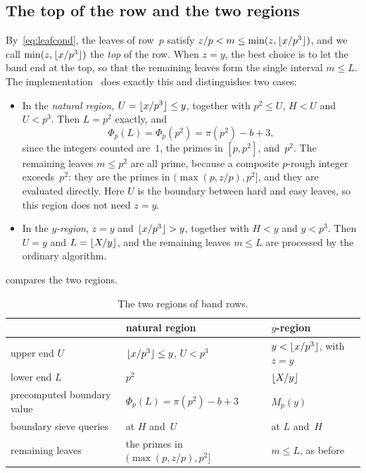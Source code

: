 \documentclass[11pt,a4paper]{amsart}
\numberwithin{equation}{section}
\DeclarePairedDelimiter{\floor}{\lfloor}{\rfloor}
\begin{document}
\subsection{The top of the row and the two regions}\label{sec:regions}
By~\eqref{eq:leafcond}, the leaves of row~$p$ satisfy
$z/p<m\le\min(z,\floor{x/p^3})$, and we call $\min(z,\floor{x/p^3})$ the
\emph{top} of the row. When $z=y$, the best choice is to let the band end at the
top, so that the remaining leaves form the single interval $m\le L$. The
implementation~\cite{PR146} does exactly this and distinguishes two
cases:
\begin{itemize}
\item In the \emph{natural region}, $U=\floor{x/p^3}\le y$, together with
$p^2\le U$, $H<U$ and $U<p^3$. Then $L=p^2$ exactly, and
\[
  \Phi_p(L)=\Phi_p(p^2)=\pi(p^2)-b+3,
\]
since the integers counted are~$1$, the primes in $[p,p^2]$, and~$p^2$. The
remaining leaves $m\le p^2$ are all prime, because a composite $p$-rough
integer exceeds~$p^2$: they are the primes in $(\max(p,z/p),p^2]$, and they are
evaluated directly. Here $U$ is the boundary between hard and easy leaves, so this region does
not need $z=y$.
\item In the \emph{$y$-region}, $z=y$ and $\floor{x/p^3}>y$, together with
$H<y$ and $y<p^3$. Then $U=y$ and $L=\floor{X/y}$, and the remaining leaves
$m\le L$ are processed by the ordinary algorithm.
\end{itemize}
 compares the two regions.

\begin{table}[htb]
\caption{The two regions of band rows.}\label{tab:regions}
\centering
\begin{tabular}{@{}lll@{}}
\toprule
 & natural region & $y$-region\\
\midrule
upper end $U$ & $\floor{x/p^3}\le y$, $U<p^3$ & $y<\floor{x/p^3}$, with $z=y$\\
lower end $L$ & $p^2$ & $\floor{X/y}$\\
precomputed boundary value & $\Phi_p(L)=\pi(p^2)-b+3$ & $M_p(y)$\\
boundary sieve queries & at $H$ and~$U$ & at $L$ and~$H$\\
remaining leaves & the primes in $(\max(p,z/p),p^2]$ & $m\le L$, as before\\
\bottomrule
\end{tabular}
\end{table}
\end{document}
